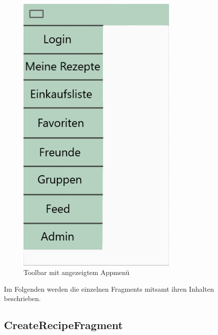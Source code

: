 \begin{figure}[H]
	\centering
	\includegraphics[width=0.7\textwidth]{pics/ToolbarMenu.png}%
	\caption{Toolbar mit angezeigtem Appmenü}%
	\label{menu}%
\end{figure}

Im Folgenden werden die einzelnen Fragments mitsamt ihren Inhalten beschrieben.

\subsection{CreateRecipeFragment}

